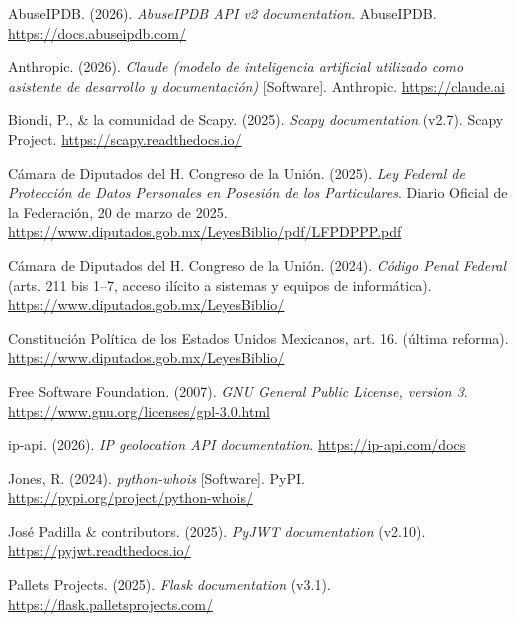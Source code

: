 \documentclass[12pt,letterpaper]{report}
\begin{document}
\begin{list}{}{\setlength{\itemindent}{-0.7cm}\setlength{\leftmargin}{0.7cm}
\setlength{\itemsep}{0.25cm}}

\item AbuseIPDB. (2026). \textit{AbuseIPDB API v2 documentation}.
  AbuseIPDB. \url{https://docs.abuseipdb.com/}

\item Anthropic. (2026). \textit{Claude (modelo de inteligencia artificial
  utilizado como asistente de desarrollo y documentación)} [Software].
  Anthropic. \url{https://claude.ai}

\item Biondi, P., \& la comunidad de Scapy. (2025). \textit{Scapy
  documentation} (v2.7). Scapy Project. \url{https://scapy.readthedocs.io/}

\item Cámara de Diputados del H. Congreso de la Unión. (2025). \textit{Ley
  Federal de Protección de Datos Personales en Posesión de los
  Particulares}. Diario Oficial de la Federación, 20 de marzo de 2025.
  \url{https://www.diputados.gob.mx/LeyesBiblio/pdf/LFPDPPP.pdf}

\item Cámara de Diputados del H. Congreso de la Unión. (2024).
  \textit{Código Penal Federal} (arts. 211 bis 1--7, acceso ilícito a
  sistemas y equipos de informática).
  \url{https://www.diputados.gob.mx/LeyesBiblio/}

\item Constitución Política de los Estados Unidos Mexicanos, art. 16.
  (última reforma). \url{https://www.diputados.gob.mx/LeyesBiblio/}

\item Free Software Foundation. (2007). \textit{GNU General Public License,
  version 3}. \url{https://www.gnu.org/licenses/gpl-3.0.html}

\item ip-api. (2026). \textit{IP geolocation API documentation}.
  \url{https://ip-api.com/docs}

\item Jones, R. (2024). \textit{python-whois} [Software]. PyPI.
  \url{https://pypi.org/project/python-whois/}

\item Jos\'e Padilla \& contributors. (2025). \textit{PyJWT documentation}
  (v2.10). \url{https://pyjwt.readthedocs.io/}

\item Pallets Projects. (2025). \textit{Flask documentation} (v3.1).
  \url{https://flask.palletsprojects.com/}


\end{list}
\end{document}
